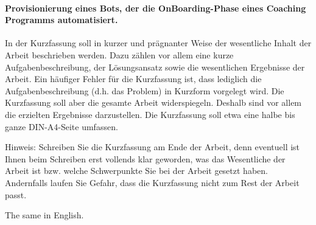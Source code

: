 \kurzfassung

\paragraph{Provisionierung eines Bots, der die OnBoarding-Phase eines Coaching Programms automatisiert.}




In der Kurzfassung soll in kurzer und prägnanter Weise der wesentliche Inhalt der Arbeit beschrieben werden. Dazu zählen vor allem eine kurze Aufgabenbeschreibung, der Lösungsansatz sowie die wesentlichen Ergebnisse der Arbeit. Ein häufiger Fehler für die Kurzfassung ist, dass lediglich die Aufgabenbeschreibung (d.h. das Problem) in Kurzform vorgelegt wird. Die Kurzfassung soll aber die gesamte Arbeit widerspiegeln. Deshalb sind vor allem die erzielten Ergebnisse darzustellen. Die Kurzfassung soll etwa eine halbe bis ganze DIN-A4-Seite umfassen.

Hinweis: Schreiben Sie die Kurzfassung am Ende der Arbeit, denn eventuell ist Ihnen beim Schreiben erst vollends klar geworden, was das Wesentliche der Arbeit ist bzw. welche Schwerpunkte Sie bei der Arbeit gesetzt haben. Andernfalls laufen Sie Gefahr, dass die Kurzfassung nicht zum Rest der Arbeit passt.

\kurzfassungEN

The same in English.
